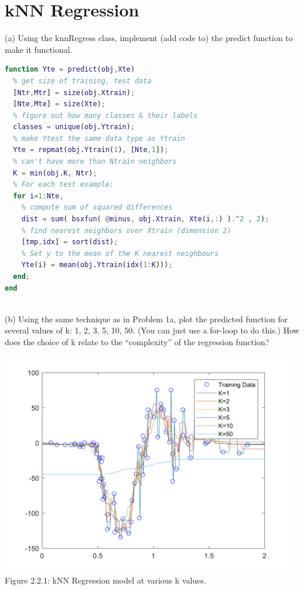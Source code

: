 \documentclass[]{report}   %
\begin{document}
\section{kNN Regression}
(a) Using the knnRegress class, implement (add code to) the predict function to make it functional.
\begin{lstlisting}[language=Matlab, caption=predict() Implementation]
% Test function: predict on Xtest
function Yte = predict(obj,Xte)
  % get size of training, test data
  [Ntr,Mtr] = size(obj.Xtrain);
  [Nte,Mte] = size(Xte);
  % figure out how many classes & their labels
  classes = unique(obj.Ytrain);        
  % make Ytest the same data type as Ytrain  
  Yte = repmat(obj.Ytrain(1), [Nte,1]);  
  % can't have more than Ntrain neighbors
  K = min(obj.K, Ntr);                  
  % For each test example:
  for i=1:Nte,                
    % compute sum of squared differences          
    dist = sum( bsxfun( @minus, obj.Xtrain, Xte(i,:) ).^2 , 2);  
    % find nearest neighbors over Xtrain (dimension 2)
    [tmp,idx] = sort(dist);                                                
    % Set y to the mean of the K nearest neighbours
    Yte(i) = mean(obj.Ytrain(idx(1:K)));   
  end;
end
\end{lstlisting}
~\\
(b) Using the same technique as in Problem 1a, plot the predicted function for several values of k: 1, 2, 3, 5, 10, 50. (You can just use a for-loop to do this.) How does the choice of k relate to the “complexity” of the regression function?

\begin{center}
	\includegraphics[width=35em]{2_2_Figure_1.png}
	{Figure 2.2.1: kNN Regression model at various k values.}
\end{center} 
\end{document}
